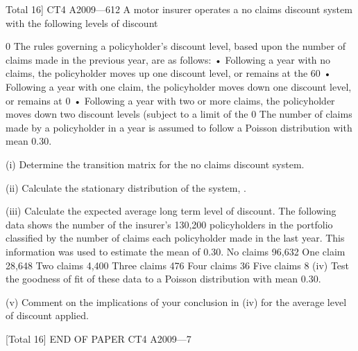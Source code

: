 Total 16]
CT4 A2009—612
A motor insurer operates a no claims discount system with the following levels of
discount {0%
The rules governing a policyholder’s discount level, based upon the number of claims
made in the previous year, are as follows:
• Following a year with no claims, the policyholder moves up one discount level, or
remains at the 60%
• Following a year with one claim, the policyholder moves down one discount level,
or remains at 0%
• Following a year with two or more claims, the policyholder moves down two
discount levels (subject to a limit of the 0%
The number of claims made by a policyholder in a year is assumed to follow a
Poisson distribution with mean 0.30.
\item (i) Determine the transition matrix for the no claims discount system. 
\item (ii) Calculate the stationary distribution of the system, \pi . 
\item (iii) Calculate the expected average long term level of discount. 
The following data shows the number of the insurer’s 130,200 policyholders in the
portfolio classified by the number of claims each policyholder made in the last year.
This information was used to estimate the mean of 0.30.
No claims
96,632
One claim
28,648
Two claims
4,400
Three claims
476
Four claims
36
Five claims
8
(iv) Test the goodness of fit of these data to a Poisson distribution with mean 0.30.

(v) Comment on the implications of your conclusion in (iv) for the average level
of discount applied.

[Total 16]
END OF PAPER
CT4 A2009—7

\newpage


}
